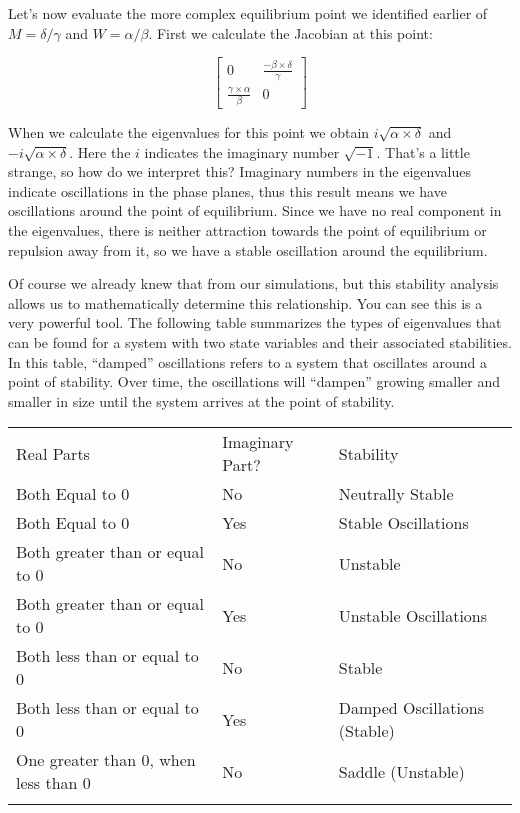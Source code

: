 \documentclass[]{memoir}
\begin{document}
Let's now evaluate the more complex equilibrium point we identified
earlier of $M=\delta/\gamma$ and $W=\alpha/\beta$. First we calculate
the Jacobian at this point:

\[
\begin{bmatrix}
0 & \frac{-\beta \times \delta}{\gamma} \\
\frac{\gamma \times \alpha}{\beta} & 0
\end{bmatrix}
\]

When we calculate the eigenvalues for this point we obtain
$i\sqrt{\alpha \times \delta}$ and $-i\sqrt{\alpha \times \delta}$. Here
the $i$ indicates the imaginary number $\sqrt{-1}$. That's a little
strange, so how do we interpret this? Imaginary numbers in the
eigenvalues indicate oscillations in the phase planes, thus this result
means we have oscillations around the point of equilibrium. Since we
have no real component in the eigenvalues, there is neither attraction
towards the point of equilibrium or repulsion away from it, so we have a
stable oscillation around the equilibrium.

Of course we already knew that from our simulations, but this stability
analysis allows us to mathematically determine this relationship. You
can see this is a very powerful tool. The following table summarizes the
types of eigenvalues that can be found for a system with two state
variables and their associated stabilities. In this table, ``damped''
oscillations refers to a system that oscillates around a point of
stability. Over time, the oscillations will ``dampen'' growing smaller
and smaller in size until the system arrives at the point of stability.

\begin{longtable}[c]{@{}lll@{}}
\hline\noalign{\medskip}
Real Parts & Imaginary Part? & Stability
\\\noalign{\medskip}
\hline\noalign{\medskip}
Both Equal to 0 & No & Neutrally Stable
\\\noalign{\medskip}
Both Equal to 0 & Yes & Stable Oscillations
\\\noalign{\medskip}
Both greater than or equal to 0 & No & Unstable
\\\noalign{\medskip}
Both greater than or equal to 0 & Yes & Unstable Oscillations
\\\noalign{\medskip}
Both less than or equal to 0 & No & Stable
\\\noalign{\medskip}
Both less than or equal to 0 & Yes & Damped Oscillations (Stable)
\\\noalign{\medskip}
One greater than 0, when less than 0 & No & Saddle (Unstable)
\\\noalign{\medskip}
\hline
\end{longtable}
\end{document}
